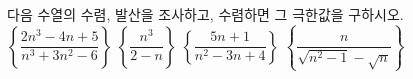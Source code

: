다음 수열의 수렴, 발산을 조사하고, 수렴하면 그 극한값을 구하시오.
 $\left\{\dfrac{2n^3-4n+5}{n^3+3n^2-6}\right\}$
 $\left\{\dfrac{n^3}{2-n}\right\}$
 $\left\{\dfrac{5n+1}{n^2-3n+4}\right\}$
 $\left\{\dfrac{n}{\sqrt{n^2-1}-\sqrt{n}}\right\}$
